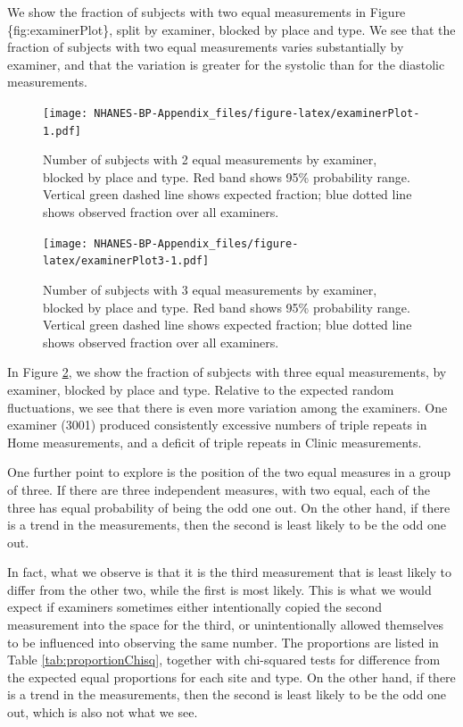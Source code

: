 \documentclass[
]{article}
\begin{document}
We show the fraction of subjects with two equal measurements in Figure \{fig:examinerPlot\}, split by examiner, blocked by place and type.
We see that the fraction of subjects with two equal measurements varies substantially by examiner, and that the variation is greater for the systolic than for the diastolic measurements.

\begin{figure}
\centering
\texttt{[image: NHANES-BP-Appendix\_files/figure-latex/examinerPlot-1.pdf]}
\caption{\label{fig:examinerPlot}Number of subjects with 2 equal measurements by examiner, blocked by place and type. Red band shows 95\% probability range. Vertical green dashed line shows expected fraction; blue dotted line shows observed fraction over all examiners.}
\end{figure}

\begin{figure}
\centering
\texttt{[image: NHANES-BP-Appendix\_files/figure-latex/examinerPlot3-1.pdf]}
\caption{\label{fig:examinerPlot3}Number of subjects with 3 equal measurements by examiner, blocked by place and type. Red band shows 95\% probability range. Vertical green dashed line shows expected fraction; blue dotted line shows observed fraction over all examiners.}
\end{figure}

In Figure \ref{fig:examinerPlot3}, we show the fraction of subjects with three equal measurements, by examiner, blocked by place and type.
Relative to the expected random fluctuations, we see that there is even more variation among the examiners.
One examiner (3001) produced consistently excessive numbers of triple repeats in Home measurements, and a deficit of triple repeats in Clinic measurements.

One further point to explore is the position of the two equal measures in a group of three.
If there are three independent measures, with two equal, each of the three has equal probability of being the odd one out.
On the other hand, if there is a trend in the measurements, then the second is least likely to be the odd one out.

In fact, what we observe is that it is the third measurement that is least likely to differ from the other two, while the first is most likely.
This is what we would expect if examiners sometimes either intentionally copied the second measurement into the space for the third, or unintentionally allowed themselves to be influenced into observing the same number.
The proportions are listed in Table \ref{tab:proportionChisq}, together with chi-squared tests for difference from the expected equal proportions for each site and type.
On the other hand, if there is a trend in the measurements, then the second is least likely to be the odd one out, which is also not what we see.
\end{document}
